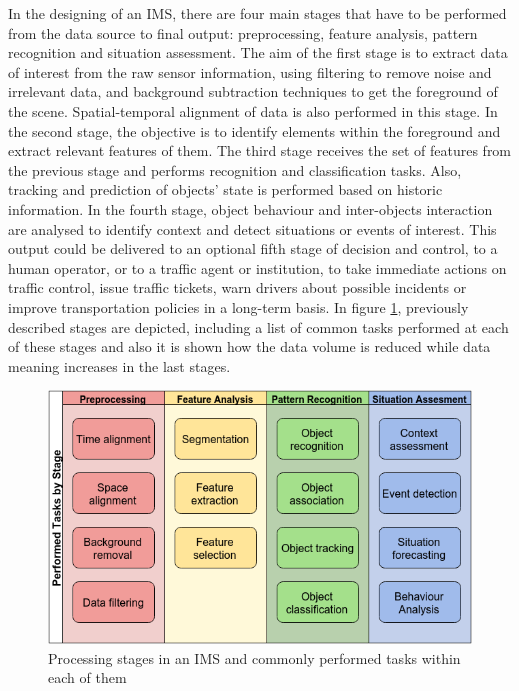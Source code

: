 In the designing of an IMS, there are four main stages that have to be performed from the data source to final output: preprocessing, feature analysis, pattern recognition and situation assessment. The aim of the first stage is to extract data of interest from the raw sensor information, using filtering to remove noise and irrelevant data, and background subtraction techniques to get the foreground of the scene. Spatial-temporal alignment of data is also performed in this stage. In the second stage, the objective is to identify elements within the foreground and extract relevant features of them. The third stage receives the set of features from the previous stage and performs recognition and classification tasks. Also, tracking and prediction of objects' state is performed based on historic information. In the fourth stage, object behaviour and inter-objects interaction are analysed to identify context and detect situations or events of interest. This output could be delivered to an optional fifth stage of decision and control, to a human operator, or to a traffic agent or institution, to take immediate actions on traffic control, issue traffic tickets, warn drivers about possible incidents or improve transportation policies in a long-term basis. In figure \ref{proc_stages}, previously described stages are depicted, including a list of common tasks performed at each of these stages and also it is shown how the data volume is reduced while data meaning increases in the last stages. 

\begin{figure}[ht!]
\centering
\includegraphics[scale=0.55]{fig/3/processing_stages_and_tasks.png}
\caption{Processing stages in an IMS and commonly performed tasks within each of them}
\label{proc_stages}
\end{figure}


